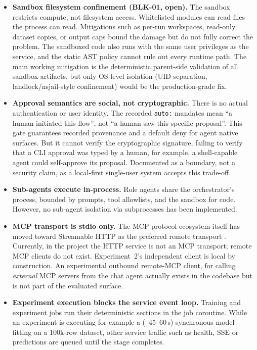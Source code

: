 \begin{itemize}
	\item \textbf{Sandbox filesystem confinement (BLK-01, open).} The sandbox restricts compute, not filesystem access. Whitelisted modules can read files the process can read. Mitigations such as per-run workspaces, read-only dataset copies, or output caps bound the damage but do not fully correct the problem. The sandboxed code also runs with the same user privileges as the service, and the static AST policy cannot rule out every runtime path. The main working mitigation is the deterministic parent-side validation of all sandbox artifacts, but only OS-level isolation (UID separation, landlock/nsjail-style confinement) would be the production-grade fix.

	\item \textbf{Approval semantics are social, not cryptographic.} There is no actual authentication or user identity. The recorded \texttt{auto:} mandates mean ``a human initiated this flow'', not ``a human saw this specific proposal''. This gate guarantees recorded provenance and a default deny for agent native surfaces. But it cannot verify the cryptographic signature, failing to verify that a CLI approval was typed by a human, for example, a shell-capable agent could self-approve its proposal. Documented as a boundary, not a security claim, as a local-first single-user system accepts this trade-off.

	\item \textbf{Sub-agents execute in-process.} Role agents share the orchestrator's process, bounded by prompts, tool allowlists, and the sandbox for code. However, no sub-agent isolation via subprocesses has been implemented.

	\item \textbf{MCP transport is stdio only.} The MCP protocol ecosystem itself has moved toward Streamable HTTP as the preferred remote transport \cite{mcp2025transports}. Currently, in the project the HTTP service is not an MCP transport; remote MCP clients do not exist. Experiment~2's independent client is local by construction. An experimental outbound remote-MCP client, for calling \emph{external} MCP servers from the chat agent actually exists in the codebase but is not part of the evaluated surface.

	\item \textbf{Experiment execution blocks the service event loop.} Training and experiment jobs run their deterministic sections in the job coroutine. While an experiment is executing for example a (~45--60\,s) synchronous model fitting on a 100k-row dataset, other service traffic such as health, SSE or predictions are queued until the stage completes.


\end{itemize}
